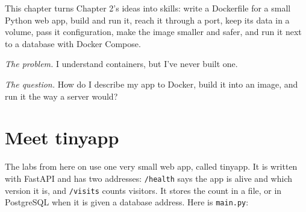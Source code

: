 
\begin{chapterintro}

This chapter turns Chapter 2's ideas into skills: write a Dockerfile for a small Python web app, build and run it, reach it through a port, keep its data in a volume, pass it configuration, make the image smaller and safer, and run it next to a database with Docker Compose.

\end{chapterintro}

\emph{The problem.} I understand containers, but I've never built one.

\emph{The question.} How do I describe my app to Docker, build it into an image, and run it the way a server would?

\section{Meet tinyapp}\label{05-docker-in-practice:meet-tinyapp}

The labs from here on use one very small web app, called tinyapp. It is written with FastAPI and has two addresses: \texttt{/health} says the app is alive and which version it is, and \texttt{/visits} counts visitors. It stores the count in a file, or in PostgreSQL when it is given a database address. Here is \texttt{main.py}:


